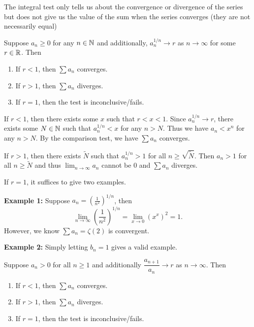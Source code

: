     \begin{remarkenv}
        The integral test only tells us about the convergence or divergence of the series but does not give us the value of the sum when the series converges (they are not necessarily equal)
    \end{remarkenv}
    \begin{theoremenv}
        Suppose $a_n \ge 0$ for any $n\in \mathbb{N}$ and additionally, $a_n^{1/n} \to r$ as $n\to \infty$ for some $r\in \mathbb{R}$. Then
        \begin{enumerate}[label=(\arabic*)]
            \item If $r<1$, then $ \sum a_n$ converges.
            \item If $r>1$, then $ \sum a_n$ diverges.
            \item If $r=1$, then the test is inconclusive/fails.
        \end{enumerate}
        
    \end{theoremenv}
    \begin{proofenv}
        If $r<1$, then there exists some $x$ such that $r<x<1$. Since $a_n^{1/n} \to r$, there exists some $N\in \mathbb{N}$ such that $a_n^{1/n} < x$ for any $n > N$. Thus we have $a_n < x^n$ for any $n > N$. By the comparison test, we have $ \sum a_n$ converges.

        If $r>1$, then there exists $\widetilde{N}$ such that $a_n^{1/n} >1$ for all $n\ge \sqrt{\widetilde{N}}$. Then $a_n>1$ for all $n\ge \widetilde{N}$ and thus $\displaystyle \lim_{n\to \infty} a_n$ cannot be $0$ and $\sum a_n$ diverges.

        If $r=1$, it suffices to give two examples.

        \textbf{Example 1:} Suppose $\displaystyle a_n = \left( \frac{1}{n^2} \right) ^{1/n}$, then
        \[
        \lim_{n\to \infty} \left( \frac{1}{n^2} \right) ^{1/n} = \lim_{x\to 0} \left( x^x \right)^2 = 1.
        \]
        However, we know $ \sum a_n = \zeta(2)$ is convergent.

        \textbf{Example 2:} Simply letting $b_n=1$ gives a valid example.
        
    \end{proofenv}
    \begin{theoremenv}
        Suppose $a_n>0$ for all $n\ge 1$ and additionally $\dfrac{a_{n+1}}{a_n} \to r$ as $n\to \infty$. Then
        \begin{enumerate}[label=(\arabic*)]
            \item If $r<1$, then $ \sum a_n$ converges.
            \item If $r>1$, then $ \sum a_n$ diverges.
            \item If $r=1$, then the test is inconclusive/fails.
        \end{enumerate}
        
    \end{theoremenv}
